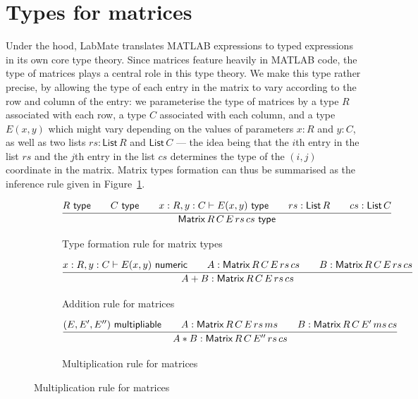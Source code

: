 \documentclass{IMEKO2024}
\newcommand{\istype}[1]{#1\ \textsf{type}}
\newcommand{\isadd}[1]{#1\ \textsf{numeric}}
\newcommand{\ismult}[3]{(#1, #2, #3)\ \textsf{multipliable}}
\newcommand{\Matrix}[5]{\mathsf{Matrix}\,#1\,#2\,#3\,#4\,#5}
\newcommand{\List}[1]{\mathsf{List}\,#1}
\begin{document}
\section{Types for matrices}

Under the hood, LabMate translates MATLAB expressions to typed
expressions in its own core type theory.
%
Since matrices feature heavily in MATLAB code, the type of matrices
plays a central role in this type theory.
%
We make this type rather precise, by allowing the type of each entry
in the matrix to vary according to the row and column of the entry:
%
we parameterise the type of matrices by a type $R$ associated with
each row, a type $C$ associated with each column, and a type $E(x,y)$
which might vary depending on the values of parameters $x : R$ and
$y : C$, as well as two lists $rs : \List{R}$ and $\List{C}$ --- the
idea being that the $i$th entry in the list $rs$ and the $j$th entry
in the list $cs$ determines the type of the $(i, j)$ coordinate in the
matrix.
%
Matrix types formation can thus be summarised as the inference rule given in Figure~\ref{fig:matrix_intro}.
%
\begin{figure}[th]
\begin{subfigure}{\textwidth}
  \begin{center}
    \[
      \infer{\istype{\Matrix{R}{C}{E}{rs}{cs}}}
      {
        \istype{R}
        &\quad
        \istype{C}
        &\quad
        x : R, y : C \vdash \istype{E(x,y)}
        &\quad
        rs : \List{R}
        &\quad
        cs : \List{C}
      }
    \]
  \end{center}
  \caption{Type formation rule for matrix types}
  \label{fig:matrix_intro}
\end{subfigure}
\hfill
\begin{subfigure}{\textwidth}
  \begin{center}
    \[
      \infer{A + B : \Matrix{R}{C}{E}{rs}{cs}}
      {
        x : R, y : C \vdash \isadd{E(x, y)}
        &\quad
        A : \Matrix{R}{C}{E}{rs}{cs}
        &\quad
        B : \Matrix{R}{C}{E}{rs}{cs}
      }
    \]
  \end{center}
  \caption{Addition rule for matrices}
  \label{fig:matrix_add}
\end{subfigure}
\hfill
\begin{subfigure}{\textwidth}
  \begin{center}
    \[
      \infer{A * B : \Matrix{R}{C}{E''}{rs}{cs}}
      {
        \ismult{E}{E'}{E''}
        &\quad
        A : \Matrix{R}{C}{E}{rs}{ms}
        &\quad
        B : \Matrix{R}{C}{E'}{ms}{cs}
      }
    \]
  \end{center}
  \caption{Multiplication rule for matrices}
  \label{fig:matrix_mul}
\end{subfigure}
\label{fig:matrix_rules}
\end{figure}
\end{document}

